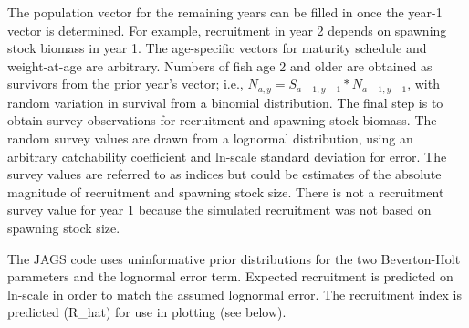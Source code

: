 \documentclass[
]{krantz}
\begin{document}
The population vector for the remaining years can be filled in once the year-1 vector is determined. For example, recruitment in year 2 depends on spawning stock biomass in year 1. The age-specific vectors for maturity schedule and weight-at-age are arbitrary. Numbers of fish age 2 and older are obtained as survivors from the prior year's vector; i.e., \(N_{a,y}=S_{a-1,y-1}*N_{a-1,y-1}\), with random variation in survival from a binomial distribution. The final step is to obtain survey observations for recruitment and spawning stock biomass. The random survey values are drawn from a lognormal distribution, using an arbitrary catchability coefficient and ln-scale standard deviation for error. The survey values are referred to as indices but could be estimates of the absolute magnitude of recruitment and spawning stock size. There is not a recruitment survey value for year 1 because the simulated recruitment was not based on spawning stock size.

The JAGS code uses uninformative prior distributions for the two Beverton-Holt parameters and the lognormal error term. Expected recruitment is predicted on ln-scale in order to match the assumed lognormal error. The recruitment index is predicted (R\_hat) for use in plotting (see below).
\end{document}
